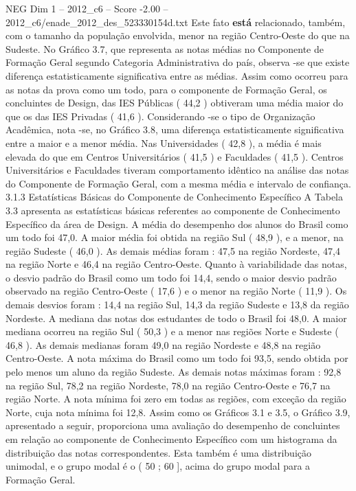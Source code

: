 \begin{textsample}{NEG Dim 1 – 2012\_c6 – Score -2.00 – 2012\_c6/enade\_2012\_des\_523330154d.txt}
Este fato \textbf{está} relacionado, também, com o tamanho da população envolvida, menor na região Centro-Oeste do que na Sudeste.
No Gráfico 3.7, que representa as notas médias no Componente de Formação Geral segundo Categoria Administrativa do país, observa -se que existe diferença estatisticamente significativa entre as médias.
Assim como ocorreu para as notas da prova como um todo, para o componente de Formação Geral, os concluintes de Design, das IES Públicas ( 44,2 ) obtiveram uma média maior do que os das IES Privadas ( 41,6 ).
Considerando -se o tipo de Organização Acadêmica, nota -se, no Gráfico 3.8, uma diferença estatisticamente significativa entre a maior e a menor média.
Nas Universidades ( 42,8 ), a média é mais elevada do que em Centros Universitários ( 41,5 ) e Faculdades ( 41,5 ).
Centros Universitários e Faculdades tiveram comportamento idêntico na análise das notas do Componente de Formação Geral, com a mesma média e intervalo de confiança. 3.1.3 Estatísticas Básicas do Componente de Conhecimento Específico A Tabela 3.3 apresenta as estatísticas básicas referentes ao componente de Conhecimento Específico da área de Design.
A média do desempenho dos alunos do Brasil como um todo foi 47,0.
A maior média foi obtida na região Sul ( 48,9 ), e a menor, na região Sudeste ( 46,0 ).
As demais médias foram : 47,5 na região Nordeste, 47,4 na região Norte e 46,4 na região Centro-Oeste.
Quanto à variabilidade das notas, o desvio padrão do Brasil como um todo foi 14,4, sendo o maior desvio padrão observado na região Centro-Oeste ( 17,6 ) e o menor na região Norte ( 11,9 ).
Os demais desvios foram : 14,4 na região Sul, 14,3 da região Sudeste e 13,8 da região Nordeste.
A mediana das notas dos estudantes de todo o Brasil foi 48,0.
A maior mediana ocorreu na região Sul ( 50,3 ) e a menor nas regiões Norte e Sudeste ( 46,8 ).
As demais medianas foram 49,0 na região Nordeste e 48,8 na região Centro-Oeste.
A nota máxima do Brasil como um todo foi 93,5, sendo obtida por pelo menos um aluno da região Sudeste.
As demais notas máximas foram : 92,8 na região Sul, 78,2 na região Nordeste, 78,0 na região Centro-Oeste e 76,7 na região Norte.
A nota mínima foi zero em todas as regiões, com exceção da região Norte, cuja nota mínima foi 12,8.
Assim como os Gráficos 3.1 e 3.5, o Gráfico 3.9, apresentado a seguir, proporciona uma avaliação do desempenho de concluintes em relação ao componente de Conhecimento Específico com um histograma da distribuição das notas correspondentes.
Esta também é uma distribuição unimodal, e o grupo modal é o ( 50 ; 60 ], acima do grupo modal para a Formação Geral.

\end{textsample}
